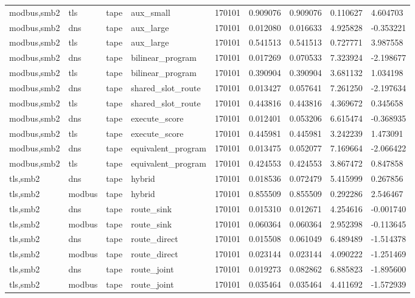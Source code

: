 \begin{tabular}{lllllllll}
modbus,smb2 & tls & tape & aux\_small & 170101 & 0.909076 & 0.909076 & 0.110627 & 4.604703 \\
modbus,smb2 & dns & tape & aux\_large & 170101 & 0.012080 & 0.016633 & 4.925828 & -0.353221 \\
modbus,smb2 & tls & tape & aux\_large & 170101 & 0.541513 & 0.541513 & 0.727771 & 3.987558 \\
modbus,smb2 & dns & tape & bilinear\_program & 170101 & 0.017269 & 0.070533 & 7.323924 & -2.198677 \\
modbus,smb2 & tls & tape & bilinear\_program & 170101 & 0.390904 & 0.390904 & 3.681132 & 1.034198 \\
modbus,smb2 & dns & tape & shared\_slot\_route & 170101 & 0.013427 & 0.057641 & 7.261250 & -2.197634 \\
modbus,smb2 & tls & tape & shared\_slot\_route & 170101 & 0.443816 & 0.443816 & 4.369672 & 0.345658 \\
modbus,smb2 & dns & tape & execute\_score & 170101 & 0.012401 & 0.053206 & 6.615474 & -0.368935 \\
modbus,smb2 & tls & tape & execute\_score & 170101 & 0.445981 & 0.445981 & 3.242239 & 1.473091 \\
modbus,smb2 & dns & tape & equivalent\_program & 170101 & 0.013475 & 0.052077 & 7.169664 & -2.066422 \\
modbus,smb2 & tls & tape & equivalent\_program & 170101 & 0.424553 & 0.424553 & 3.867472 & 0.847858 \\
tls,smb2 & dns & tape & hybrid & 170101 & 0.018536 & 0.072479 & 5.415999 & 0.267856 \\
tls,smb2 & modbus & tape & hybrid & 170101 & 0.855509 & 0.855509 & 0.292286 & 2.546467 \\
tls,smb2 & dns & tape & route\_sink & 170101 & 0.015310 & 0.012671 & 4.254616 & -0.001740 \\
tls,smb2 & modbus & tape & route\_sink & 170101 & 0.060364 & 0.060364 & 2.952398 & -0.113645 \\
tls,smb2 & dns & tape & route\_direct & 170101 & 0.015508 & 0.061049 & 6.489489 & -1.514378 \\
tls,smb2 & modbus & tape & route\_direct & 170101 & 0.023144 & 0.023144 & 4.090222 & -1.251469 \\
tls,smb2 & dns & tape & route\_joint & 170101 & 0.019273 & 0.082862 & 6.885823 & -1.895600 \\
tls,smb2 & modbus & tape & route\_joint & 170101 & 0.035464 & 0.035464 & 4.411692 & -1.572939 \\

\end{tabular}
